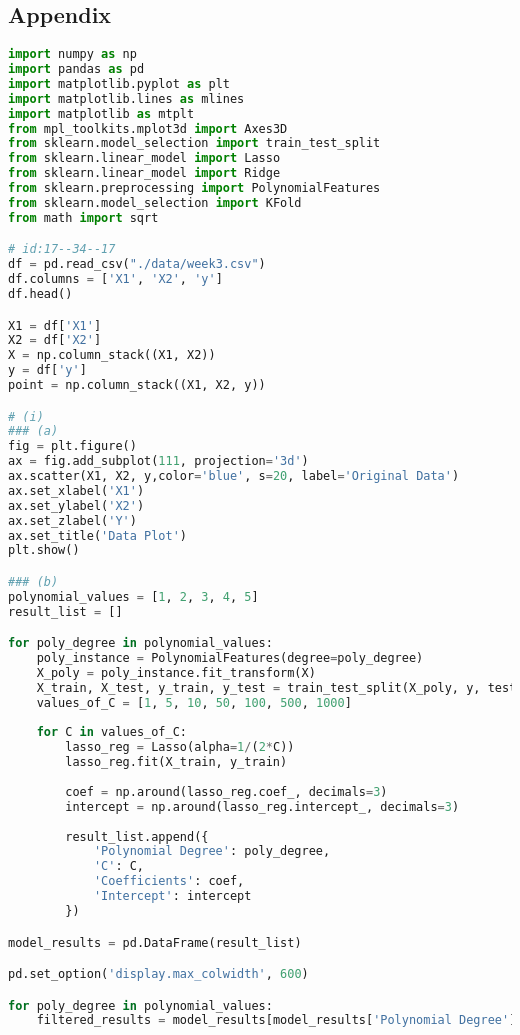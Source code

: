 \documentclass[a4paper,10pt]{article}
\begin{document}
\begin{enumerate}
\section*{Appendix}
\begin{lstlisting}[language=Python, caption={}]
import numpy as np
import pandas as pd
import matplotlib.pyplot as plt
import matplotlib.lines as mlines
import matplotlib as mtplt
from mpl_toolkits.mplot3d import Axes3D
from sklearn.model_selection import train_test_split
from sklearn.linear_model import Lasso
from sklearn.linear_model import Ridge
from sklearn.preprocessing import PolynomialFeatures
from sklearn.model_selection import KFold
from math import sqrt

# id:17--34--17 
df = pd.read_csv("./data/week3.csv")
df.columns = ['X1', 'X2', 'y']
df.head()

X1 = df['X1']
X2 = df['X2']
X = np.column_stack((X1, X2))
y = df['y']
point = np.column_stack((X1, X2, y))

# (i) 
### (a)
fig = plt.figure()
ax = fig.add_subplot(111, projection='3d')
ax.scatter(X1, X2, y,color='blue', s=20, label='Original Data')
ax.set_xlabel('X1')
ax.set_ylabel('X2')
ax.set_zlabel('Y')
ax.set_title('Data Plot')
plt.show()

### (b) 
polynomial_values = [1, 2, 3, 4, 5]
result_list = []

for poly_degree in polynomial_values:
    poly_instance = PolynomialFeatures(degree=poly_degree)
    X_poly = poly_instance.fit_transform(X)
    X_train, X_test, y_train, y_test = train_test_split(X_poly, y, test_size=0.20, random_state=42)
    values_of_C = [1, 5, 10, 50, 100, 500, 1000]
    
    for C in values_of_C:
        lasso_reg = Lasso(alpha=1/(2*C))
        lasso_reg.fit(X_train, y_train)
        
        coef = np.around(lasso_reg.coef_, decimals=3)
        intercept = np.around(lasso_reg.intercept_, decimals=3)
        
        result_list.append({
            'Polynomial Degree': poly_degree,
            'C': C,
            'Coefficients': coef,
            'Intercept': intercept
        })

model_results = pd.DataFrame(result_list)

pd.set_option('display.max_colwidth', 600)

for poly_degree in polynomial_values:
    filtered_results = model_results[model_results['Polynomial Degree'] == poly_degree]
    

\end{lstlisting}
\end{enumerate}
\end{document}
